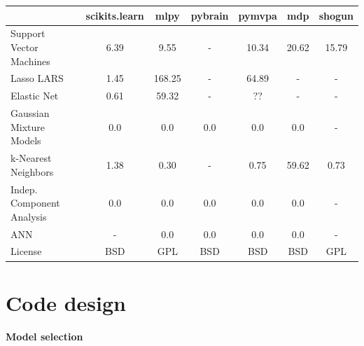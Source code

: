 \documentclass[twoside,11pt]{article}
\begin{document}
\begin{center}


\begin{tabular}{l c c c c c c}
\hline\hline %
 & scikits.learn & mlpy & pybrain & pymvpa &  mdp & shogun \\ [0.5ex]
\hline
Support Vector Machines & 6.39 & 9.55 & - & 10.34 & 20.62 & 15.79 \\
Lasso LARS & 1.45 & 168.25   & -       &  64.89     & -    & - \\
Elastic Net & 0.61 & 59.32 & -  &  ??  & -  & - \\
Gaussian Mixture Models  & 0.0 & 0.0   & 0.0       &  0.0     & 0.0    & - \\
k-Nearest Neighbors & 1.38 & 0.30  & - &  0.75 & 59.62    & 0.73 \\
Indep. Component Analysis & 0.0 & 0.0  & 0.0  & 0.0  & 0.0  & - \\
ANN  & - & 0.0  & 0.0  & 0.0  & 0.0  & - \\
License &  BSD & GPL & BSD  &  BSD  & BSD  & GPL \\
\hline
\end{tabular}

\end{center}





\section{Code design}


\paragraph {Model selection}
\end{document}
